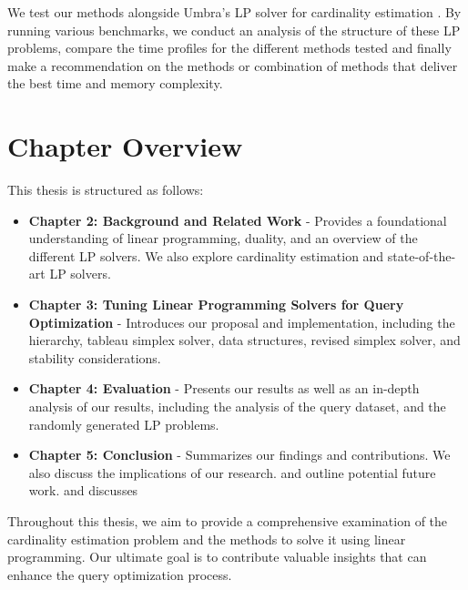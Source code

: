  We test our methods alongside Umbra's LP solver for cardinality estimation \parencite{neumann2020umbra}. 
 By running various benchmarks, we conduct an analysis of the structure of these LP problems, compare the time profiles for the different methods tested and finally 
 make a recommendation on the methods or combination of methods that deliver the best time and memory complexity.
 
 \section{Chapter Overview}
 
 This thesis is structured as follows:
 
 \begin{itemize}
   \item \textbf{Chapter 2: Background and Related Work} - Provides a 
   foundational understanding of linear programming, duality, 
   and an overview of the different LP solvers. We also explore cardinality
    estimation and state-of-the-art LP solvers.
   \item \textbf{Chapter 3: Tuning Linear Programming Solvers for Query
    Optimization} - Introduces our proposal and implementation, 
    including the hierarchy, tableau simplex solver, data structures, 
    revised simplex solver, and stability considerations.
   \item \textbf{Chapter 4: Evaluation} - Presents our results as well as
   an in-depth analysis 
   of our results, including the analysis of the query dataset, and the
    randomly generated LP problems.
   \item \textbf{Chapter 5: Conclusion} - Summarizes our findings 
   and contributions.  We also discuss the implications of our research. and outline potential future work.
   and discusses 
 \end{itemize}
 
 Throughout this thesis, we aim to provide a comprehensive 
 examination of the cardinality estimation problem and the methods 
 to solve it using linear programming. Our ultimate goal is to contribute 
 valuable insights that can enhance the
 query optimization process.
 